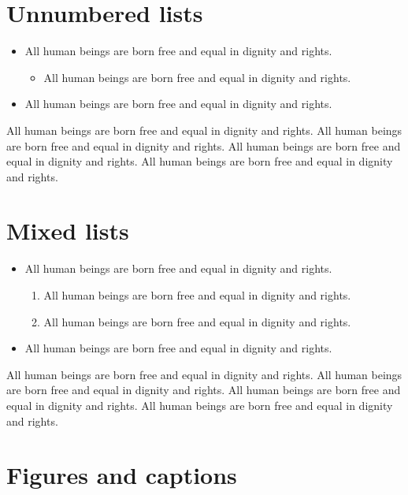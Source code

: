 \documentclass[
  titlepage,
  openright,
  DIV=calc,
  toc=listof,
  listof=nochaptergap]{scrbook}
\providecommand{\tightlist}{%
  \setlength{\itemsep}{0pt}\setlength{\parskip}{0pt}}
\begin{document}
\section{Unnumbered lists}\label{unnumbered-lists}

\begin{itemize}
\tightlist
\item
  All human beings are born free and equal in dignity and rights.

  \begin{itemize}
  \tightlist
  \item
    All human beings are born free and equal in dignity and rights.
  \end{itemize}
\item
  All human beings are born free and equal in dignity and rights.
\end{itemize}

All human beings are born free and equal in dignity and rights. All
human beings are born free and equal in dignity and rights. All human
beings are born free and equal in dignity and rights. All human beings
are born free and equal in dignity and rights.

\section{Mixed lists}\label{mixed-lists}

\begin{itemize}
\tightlist
\item
  All human beings are born free and equal in dignity and rights.

  \begin{enumerate}
  \def\labelenumi{\arabic{enumi}.}
  \tightlist
  \item
    All human beings are born free and equal in dignity and rights.
  \item
    All human beings are born free and equal in dignity and rights.
  \end{enumerate}
\item
  All human beings are born free and equal in dignity and rights.
\end{itemize}

All human beings are born free and equal in dignity and rights. All
human beings are born free and equal in dignity and rights. All human
beings are born free and equal in dignity and rights. All human beings
are born free and equal in dignity and rights.

\section{Figures and captions}\label{figures-and-captions}
\end{document}
